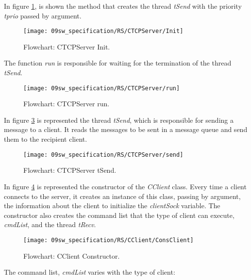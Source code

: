 In figure \ref{fig:RSInit}, is shown the method that creates the thread \textit{tSend} with the priority \textit{tprio} passed by argument.

\begin{figure}[H]
	\centering
	\texttt{[image: 09sw\_specification/RS/CTCPServer/Init]}
	\caption{Flowchart: CTCPServer Init.}
	\label{fig:RSInit}
\end{figure}

The function \textit{run} is responsible for waiting for the termination of the thread \textit{tSend}.

\begin{figure}[H]
	\centering
	\texttt{[image: 09sw\_specification/RS/CTCPServer/run]}
	\caption{Flowchart: CTCPServer run.}
	\label{fig:RSrun}
\end{figure}

In figure \ref{fig:RSsend} is represented the thread \textit{tSend}, which is responsible for sending a message to a client. It reads the messages to be sent in a message queue and send them to the recipient client.

\begin{figure}[H]
	\centering
	\texttt{[image: 09sw\_specification/RS/CTCPServer/send]}
	\caption{Flowchart: CTCPServer tSend.}
	\label{fig:RSsend}
\end{figure}


In figure \ref{fig:ClientConst} is represented the constructor of the \textit{CClient} class. Every time a client connects to the server, it creates an instance of this class, passing by argument, the information about the client to initialize the \textit{clientSock} variable. The constructor also creates the command list that the type of client can execute, \textit{cmdList}, and the thread \textit{tRecv}.

\begin{figure}[H]
	\centering
	\texttt{[image: 09sw\_specification/RS/CClient/ConsClient]}
	\caption{Flowchart: CClient Constructor.}
	\label{fig:ClientConst}
\end{figure}

The command list, \textit{cmdList} varies with the type of client:

